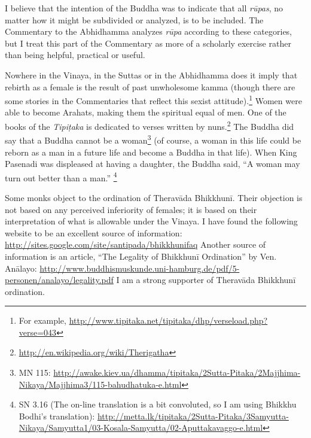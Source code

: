 
I believe that the intention of the Buddha was to indicate that all \textit{rūpas}, no matter how it might be subdivided or analyzed, is to be included. The Commentary to the Abhidhamma analyzes \textit{rūpa} according to these categories, but I treat this part of the Commentary as more of a scholarly exercise rather than being helpful, practical or useful.


Nowhere in the Vinaya, in the Suttas or in the Abhidhamma does it imply that rebirth as a female is the result of past unwholesome kamma (though there are some stories in the Commentaries that reflect this sexist attitude).\footnote{For example, \url{http://www.tipitaka.net/tipitaka/dhp/verseload.php?verse=043}} Women were able to become Arahats, making them the spiritual equal of men. One of the books of the \textit{Tipiṭaka} is dedicated to verses written by nuns.\footnote{\url{http://en.wikipedia.org/wiki/Therigatha}} The Buddha did say that a Buddha cannot be a woman\footnote{MN 115: \url{http://awake.kiev.ua/dhamma/tipitaka/2Sutta-Pitaka/2Majjhima-Nikaya/Majjhima3/115-bahudhatuka-e.html}} (of course, a woman in this life could be reborn as a man in a future life and become a Buddha in that life). When King Pasenadi was displeased at having a daughter, the Buddha said, “A woman may turn out better than a man.” \footnote{SN 3.16 (The on-line translation is a bit convoluted, so I am using Bhikkhu Bodhi’s translation): \url{http://metta.lk/tipitaka/2Sutta-Pitaka/3Samyutta-Nikaya/Samyutta1/03-Kosala-Samyutta/02-Aputtakavaggo-e.html}}

Some monks object to the ordination of Theravāda Bhikkhunī. Their objection is not based on any perceived inferiority of females; it is based on their interpretation of what is allowable under the Vinaya. I have found the following website to be an excellent source of information: \url{http://sites.google.com/site/santipada/bhikkhunifaq} Another source of information is an article, “The Legality of Bhikkhunī Ordination” by Ven. Anālayo: \url{http://www.buddhismuskunde.uni-hamburg.de/pdf/5-personen/analayo/legality.pdf} I am a strong supporter of Theravāda Bhikkhunī ordination. 